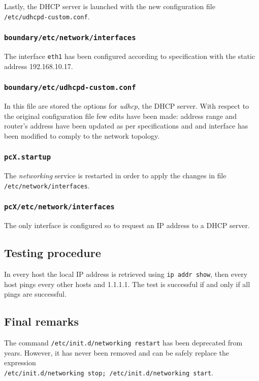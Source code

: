 \documentclass{homework}
\newcommand{\mt}{\texttt}
\begin{document}
    Lastly, the DHCP server is launched with the new configuration file \mt{/etc/udhcpd-custom.conf}.
    
    \subsubsection{\mt{boundary/etc/network/interfaces}}
    The interface \mt{eth1} has been configured according to specification with the static address 192.168.10.17.
    
    \subsubsection{\mt{boundary/etc/udhcpd-custom.conf}}
    In this file are stored the options for \textit{udhcp}, the DHCP server. With respect to the original configuration file few edits have been made: address range and router's address have been updated as per specifications and and interface has been modified to comply to the network topology.
    
    \subsubsection{\mt{pcX.startup}}
    The \textit{networking} service is restarted in order to apply the changes in file \mt{/etc/network/interfaces}.
    
    \subsubsection{\mt{pcX/etc/network/interfaces}}
    The only interface is configured so to request an IP address to a DHCP server.
    
    \subsection{Testing procedure}
    In every host the local IP address is retrieved using \mt{ip addr show}, then every host pings every other hosts and 1.1.1.1. The test is successful if and only if all pings are successful.
    
    \subsection{Final remarks}
    The command \mt{/etc/init.d/networking restart} has been deprecated from years. However, it has never been removed and can be safely replace the expression \\ \mt{/etc/init.d/networking stop; /etc/init.d/networking start}.
    
\end{document}
